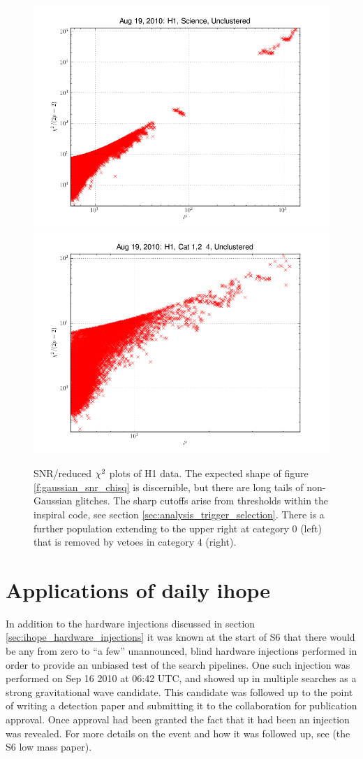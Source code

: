 \begin{figure}
  \includegraphics[width=0.5\linewidth]{figures/detchar/H1_0_UNCLUSTERED_chisq.png}
  \includegraphics[width=0.5\linewidth]{figures/detchar/H1_4_UNCLUSTERED_chisq.png}
  \caption[SNR/reduced $\chisq$ plots of H1 data.]{
  \label{f:daily_ihope_snr_chisq}
SNR/reduced $\chisq$ plots of H1 data.  The expected shape
of figure \ref{f:gaussian_snr_chisq} is discernible, but there are
long tails of non-Gaussian glitches.  The sharp cutoffs arise 
from thresholds within the inspiral code, see section
\ref{sec:analysis_trigger_selection}.  There is a further
population extending to the upper right at category 0 (left) that is
removed by vetoes in category 4 (right).}
\end{figure}%
\newpage
\section{Applications of daily ihope}

In addition to the hardware injections discussed in section
\ref{sec:ihope_hardware_injections} it was known at the start of S6
that there would be any from zero to ``a few'' unannounced, blind
hardware injections performed in order to provide an unbiased test of
the search pipelines.  One such injection was performed on  Sep 16
2010 at 06:42 UTC, and showed up in multiple searches as a strong
gravitational wave candidate.  This candidate was followed up to the
point of writing a detection paper and submitting it to the
collaboration for publication approval.  Once approval had been
granted the fact that it had been an injection was revealed.  For more
details on the event and how it was followed up, see (the S6 low mass
paper).

